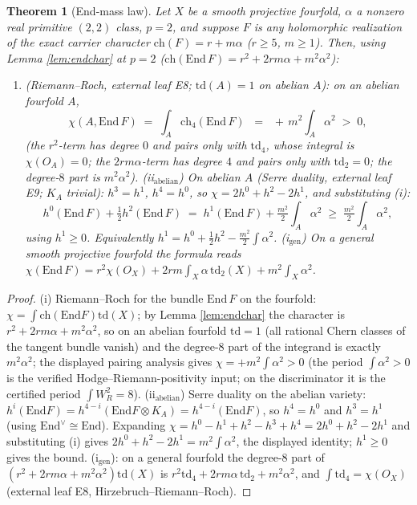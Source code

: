 \documentclass[11pt]{article}
\newtheorem{theorem}{Theorem}
\begin{document}
\begin{theorem}[End-mass law]\label{thm:W3}
Let $X$ be a smooth projective fourfold, $\alpha$ a nonzero real primitive $(2,2)$ class, $p=2$, and suppose
$F$ is \emph{any} holomorphic realization of the exact carrier character
$\mathrm{ch}(F)=r+m\alpha$ ($r\ge5$, $m\ge1$). Then, using Lemma \ref{lem:endchar} at $p=2$
($\mathrm{ch}(\mathrm{End}\,F)=r^2+2rm\alpha+m^2\alpha^2$):
\begin{enumerate}[label=(\roman*)]
\item (Riemann--Roch, external leaf E8; $\mathrm{td}(A)=1$ on abelian $A$):
on an abelian fourfold $A$,
\[
\chi(A,\mathrm{End}\,F)\;=\;\int_A \mathrm{ch}_4(\mathrm{End}\,F)\;\;=\;\;+\,m^2\int_A\alpha^{2}\;>\;0,
\]
(the $r^2$-term has degree $0$ and pairs only with $\mathrm{td}_4$, whose integral is $\chi(O_A)=0$;
the $2rm\alpha$-term has degree $4$ and pairs only with $\mathrm{td}_2=0$; the degree-$8$ part is $m^2\alpha^2$).
(ii$_{\mathrm{abelian}}$) On abelian $A$ (Serre duality, external leaf E9; $K_A$ trivial):
$h^3=h^1$, $h^4=h^0$, so $\chi=2h^0+h^2-2h^1$, and substituting (i):
\[
h^0(\mathrm{End}\,F)+\tfrac12 h^2(\mathrm{End}\,F)
\;=\;h^1(\mathrm{End}\,F)+\tfrac{m^2}{2}\int_A\alpha^2
\;\ge\;\tfrac{m^2}{2}\int_A\alpha^2 ,
\]
using $h^1\ge0$. Equivalently $h^1=h^0+\tfrac12h^2-\tfrac{m^2}{2}\int\alpha^2$.
(i$_{\mathrm{gen}}$) On a general smooth projective fourfold the formula reads
$\chi(\mathrm{End}\,F)=r^2\chi(O_X)+2rm\int_X\alpha\,\mathrm{td}_2(X)+m^2\int_X\alpha^2$.
\end{enumerate}
\end{theorem}

\begin{proof}
(i) Riemann--Roch for the bundle $\mathrm{End}\,F$ on the fourfold:
$\chi=\int\mathrm{ch}(\mathrm{End}F)\mathrm{td}(X)$; by Lemma \ref{lem:endchar} the character is
$r^2+2rm\alpha+m^2\alpha^2$, so on an abelian fourfold $\mathrm{td}=1$ (all rational Chern classes of the
tangent bundle vanish) and the degree-$8$ part of the integrand is exactly $m^2\alpha^2$; the displayed pairing
analysis gives $\chi=+m^2\int\alpha^2>0$ (the period $\int\alpha^2>0$ is the verified Hodge--Riemann-positivity
input; on the discriminator it is the certified period $\int W_R^2=8$).
(ii$_{\mathrm{abelian}}$) Serre duality on the abelian variety: $h^i(\mathrm{End}F)=h^{4-i}(\mathrm{End}F\otimes K_A)
=h^{4-i}(\mathrm{End}F)$, so $h^4=h^0$ and $h^3=h^1$ (using $\mathrm{End}^\vee\cong\mathrm{End}$). Expanding
$\chi=h^0-h^1+h^2-h^3+h^4=2h^0+h^2-2h^1$ and substituting (i) gives
$2h^0+h^2-2h^1=m^2\int\alpha^2$, the displayed identity; $h^1\ge0$ gives the bound.
(i$_{\mathrm{gen}}$): on a general fourfold the degree-$8$ part of
$(r^2+2rm\alpha+m^2\alpha^2)\mathrm{td}(X)$ is $r^2\mathrm{td}_4+2rm\alpha\,\mathrm{td}_2+m^2\alpha^2$, and
$\int\mathrm{td}_4=\chi(O_X)$ (external leaf E8, Hirzebruch--Riemann--Roch).
\end{proof}
\end{document}
